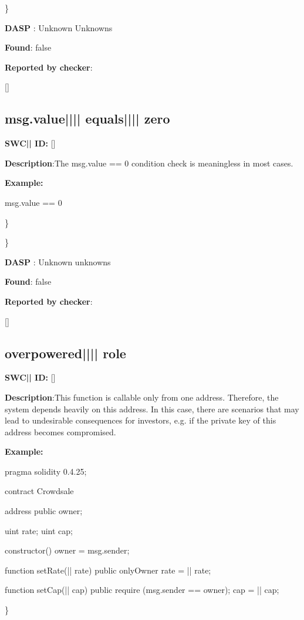 \documentclass{article}
\begin{document}
\} 

\textbf{DASP} : Unknown Unknowns

\textbf{Found}: false

\textbf{Reported by checker}: 
\begin{ffcode} 

[]
\end{ffcode} 
\subsection{msg.value{||\textunderscore|| }equals{||\textunderscore|| }zero} 
\textbf{SWC{|\textunderscore| }ID:} []

\textbf{Description}:The msg.value == 0 condition check is meaningless in most cases.


\textbf{Example:} 
\begin{ffcode} 

msg.value == 0

\end{ffcode} 
\} 

\} 

\textbf{DASP} : Unknown unknowns

\textbf{Found}: false

\textbf{Reported by checker}: 
\begin{ffcode} 

[]
\end{ffcode} 
\subsection{overpowered{||\textunderscore|| }role} 
\textbf{SWC{|\textunderscore| }ID:} []

\textbf{Description}:This function is callable only from one address. Therefore, the system depends heavily on this address. In this case, there are scenarios that may lead to undesirable consequences for investors, e.g. if the private key of this address becomes compromised.


\textbf{Example:} 
\begin{ffcode} 

pragma solidity 0.4.25;

contract Crowdsale {

    address public owner;

    uint rate;
    uint cap;

    constructor() {
        owner = msg.sender;
    }

    function setRate(|\textunderscore| rate) public onlyOwner {
        rate = |\textunderscore| rate;
    }

    function setCap(|\textunderscore| cap) public {
        require (msg.sender == owner);
        cap = |\textunderscore| cap;
    }
}

\end{ffcode} 
\} 
\end{document}
